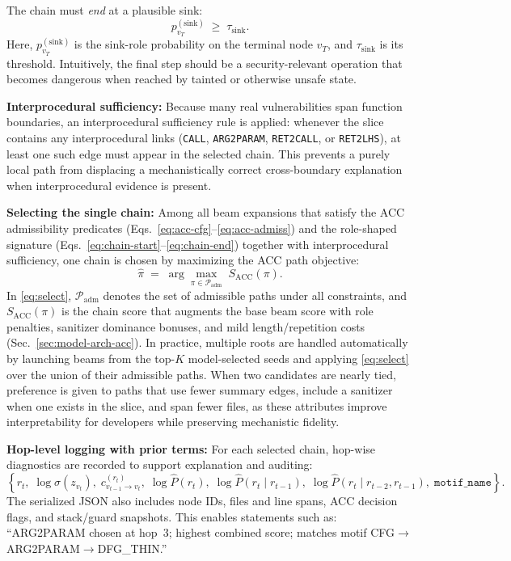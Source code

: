 \documentclass{buthesis}
\begin{document}
The chain must \emph{end} at a plausible sink:
\begin{equation}
\label{eq:chain-end}
p^{(\mathrm{sink})}_{v_T} \;\ge\; \tau_{\mathrm{sink}}.
\end{equation}
Here, $p^{(\mathrm{sink})}_{v_T}$ is the sink-role probability on the terminal node $v_T$, and $\tau_{\mathrm{sink}}$ is its threshold. Intuitively, the final step should be a security-relevant operation that becomes dangerous when reached by tainted or otherwise unsafe state.

\textbf{Interprocedural sufficiency:}
Because many real vulnerabilities span function boundaries, an interprocedural sufficiency rule is applied: whenever the slice contains any interprocedural links (\texttt{CALL}, \texttt{ARG2PARAM}, \texttt{RET2CALL}, or \texttt{RET2LHS}), at least one such edge must appear in the selected chain. This prevents a purely local path from displacing a mechanistically correct cross-boundary explanation when interprocedural evidence is present.

\textbf{Selecting the single chain:}
Among all beam expansions that satisfy the ACC admissibility predicates (Eqs.~\eqref{eq:acc-cfg}--\eqref{eq:acc-admiss}) and the role-shaped signature (Eqs.~\eqref{eq:chain-start}--\eqref{eq:chain-end}) together with interprocedural sufficiency, one chain is chosen by maximizing the ACC path objective:
\begin{equation}
\label{eq:select}
\hat{\pi} \;=\; \arg\max_{\pi \in \mathcal{P}_{\mathrm{adm}}} \; S_{\mathrm{ACC}}(\pi).
\end{equation}
In \eqref{eq:select}, $\mathcal{P}_{\mathrm{adm}}$ denotes the set of admissible paths under all constraints, and $S_{\mathrm{ACC}}(\pi)$ is the chain score that augments the base beam score with role penalties, sanitizer dominance bonuses, and mild length/repetition costs (Sec.~\ref{sec:model-arch-acc}). In practice, multiple roots are handled automatically by launching beams from the top-$K$ model-selected seeds and applying \eqref{eq:select} over the union of their admissible paths. When two candidates are nearly tied, preference is given to paths that use fewer summary edges, include a sanitizer when one exists in the slice, and span fewer files, as these attributes improve interpretability for developers while preserving mechanistic fidelity.

\textbf{Hop-level logging with prior terms:}
For each selected chain, hop-wise diagnostics are recorded to support explanation and auditing:
\[
\left\{
r_t,\;
\log\sigma(z_{v_t}),\;
c^{(r_t)}_{v_{t-1}\to v_t},\;
\log \widehat{P}(r_t),\;
\log \widehat{P}(r_t \mid r_{t-1}),\;
\log \widehat{P}(r_t \mid r_{t-2},r_{t-1}),\;
\texttt{motif\_name}
\right\}.
\]
The serialized JSON also includes node IDs, files and line spans, ACC decision flags, and stack/guard snapshots. This enables statements such as:
“\textsc{ARG2PARAM} chosen at hop~3; highest combined score; matches motif
\textsc{CFG}$\!\to$\textsc{ARG2PARAM}$\!\to$\textsc{DFG\_THIN}.”
\end{document}

